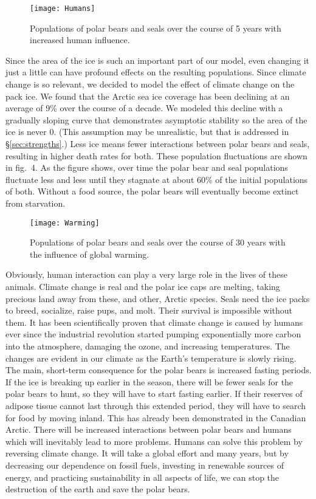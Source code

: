 \documentclass[reqno,11pt]{amsart}
\begin{document}
\begin{figure}
\texttt{[image: Humans]}
\vspace{-1.5em}
\caption{Populations of polar bears and seals over the course of 5 years with increased human influence.}
\end{figure}

Since the area of the ice is such an important part of our model, even changing it just a little can have profound effects on the resulting populations. Since climate change is so relevant, we decided to model the effect of climate change on the pack ice. We found that the Arctic sea ice coverage has been declining at an average of 9\% over the course of a decade\cite{Ice}. We modeled this decline with a gradually sloping curve that demonstrates asymptotic stability so the area of the ice is never 0. (This assumption may be unrealistic, but that is addressed in \S\ref{sec:strengths}.) Less ice means fewer interactions between polar bears and seals, resulting in higher death rates for both. These population fluctuations are shown in fig.~4. As the figure shows, over time the polar bear and seal populations fluctuate less and less until they stagnate at about 60\% of the initial populations of both. Without a food source, the polar bears will eventually become extinct from starvation.

\begin{figure}
\texttt{[image: Warming]}
\vspace{-1.5em}
\caption{Populations of polar bears and seals over the course of 30 years with the influence of global warming.}
\end{figure}

Obviously, human interaction can play a very large role in the lives of these animals. Climate change is real and the polar ice caps are melting, taking precious land away from these, and other, Arctic species. Seals need the ice packs to breed, socialize, raise pups, and molt. Their survival is impossible without them.\cite{Seal_pop} It has been scientifically proven that climate change is caused by humans ever since the industrial revolution started pumping exponentially more carbon into the atmosphere, damaging the ozone, and increasing temperatures. The changes are evident in our climate as the Earth’s temperature is slowly rising. The main, short-term consequence for the polar bears is increased fasting periods. If the ice is breaking up earlier in the season, there will be fewer seals for the polar bears to hunt, so they will have to start fasting earlier. If their reserves of adipose tissue cannot last through this extended period, they will have to search for food by moving inland. This has already been demonstrated in the Canadian Arctic. \cite{Climate} There will be increased interactions between polar bears and humans which will inevitably lead to more problems. Humans can solve this problem by reversing climate change. It will take a global effort and many years, but by decreasing our dependence on fossil fuels, investing in renewable sources of energy, and practicing sustainability in all aspects of life, we can stop the destruction of the earth and save the polar bears.
\end{document}
